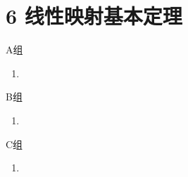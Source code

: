 \section*{6 线性映射基本定理}

\vspace{2ex}

\centerline{\heiti A组}
\begin{enumerate}
    \item
\end{enumerate}

\centerline{\heiti B组}
\begin{enumerate}
    \item
\end{enumerate}

\centerline{\heiti C组}
\begin{enumerate}
    \item
\end{enumerate}

\clearpage
